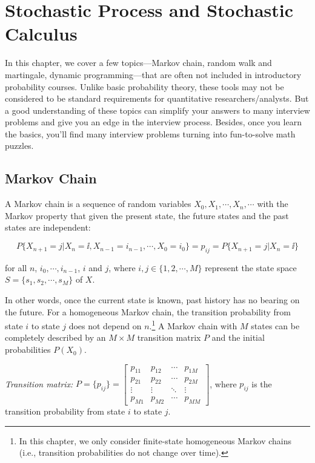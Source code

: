 
\section{Stochastic Process and Stochastic Calculus}

In this chapter, we cover a few topics---Markov chain, random walk and martingale,
dynamic programming---that are often not included in introductory probability courses.
Unlike basic probability theory, these tools may not be considered to be standard
requirements for quantitative researchers/analysts. But a good understanding of these
topics can simplify your answers to many interview problems and give you an edge in
the interview process. Besides, once you learn the basics, you'll find many interview
problems turning into fun-to-solve math puzzles.

\subsection{Markov Chain}

A Markov chain is a sequence of random variables $X_0,X_1,\cdots,X_n,\cdots$ with the
Markov property that given the present state, the future states and the past states are
independent:

\[
P\{X_{n+1}=j\vert X_n=\ii,X_{n-1}=i_{n-1},\cdots,X_0=i_0\}
=p_{ij}=P\{X_{n+1}=j\vert X_n=\ii\}
\]

for all $n$, $i_0,\cdots,i_{n-1}$, $i$ and $j$, where $i,j\in\{1,2,\cdots,M\}$
represent the state space $S=\{s_1,s_2,\cdots,s_M\}$ of $X$.

In other words, once the current state is known, past history has no bearing on the
future. For a homogeneous Markov chain, the transition probability from state $i$ to
state $j$ does not depend on $n$.\footnote[1]{In this chapter, we only consider finite-state homogeneous Markov chains (i.e., transition probabilities do not change over time).} A Markov chain with $M$ states can be completely described by an
$M\times M$ transition matrix $P$ and the initial probabilities $P(X_0)$.

\noindent\emph{Transition matrix:}
$P=\{p_{ij}\}=\begin{bmatrix}
p_{11}&p_{12}&\cdots&p_{1M}\\
p_{21}&p_{22}&\cdots&p_{2M}\\
\vdots&\vdots&\ddots&\vdots\\
p_{M1}&p_{M2}&\cdots&p_{MM}
\end{bmatrix}$,
where $p_{ij}$ is the transition probability from state $i$ to state $j$.

